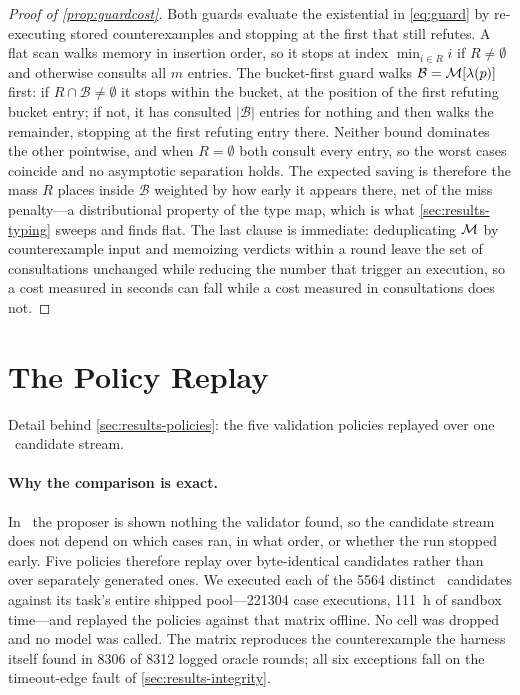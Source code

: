 \begin{proof}[Proof of \cref{prop:guardcost}]
Both guards evaluate the existential in \cref{eq:guard} by re-executing stored
counterexamples and stopping at the first that still refutes. A flat scan walks
memory in insertion order, so it stops at index $\min_{i \in R} i$ if $R \neq
\emptyset$ and otherwise consults all $m$ entries. The bucket-first guard walks
$\mathcal{B} = \mathcal{M}[\lambda(p)]$ first: if $R \cap \mathcal{B} \neq \emptyset$ it
stops within the bucket, at the position of the first refuting bucket entry; if
not, it has consulted $|\mathcal{B}|$ entries for nothing and then walks the
remainder, stopping at the first refuting entry there. Neither bound dominates
the other pointwise, and when $R = \emptyset$ both consult every entry, so the
worst cases coincide and no asymptotic separation holds. The expected saving is
therefore the mass $R$ places inside $\mathcal{B}$ weighted by how early it
appears there, net of the miss penalty---a distributional property of the type
map, which is what \cref{sec:results-typing} sweeps and finds flat. The last clause is
immediate: deduplicating $\mathcal{M}$ by counterexample input and memoizing verdicts
within a round leave the set of consultations unchanged while reducing the
number that trigger an execution, so a cost measured in seconds can fall while
a cost measured in consultations does not.
\end{proof}

\section{The Policy Replay}
\label{app:policies}

Detail behind \cref{sec:results-policies}: the five validation policies
replayed over one \armnomem\ candidate stream.

\paragraph{Why the comparison is exact.}
In \armnomem\ the proposer is shown nothing the validator found, so the
candidate stream does not depend on which cases ran, in what order, or whether
the run stopped early. Five policies therefore replay over byte-identical
candidates rather than over separately generated ones. We executed each of the
\num{5564} distinct \armnomem\ candidates against its task's entire shipped
pool---\num{221304} case executions, \SI{111}{\hour} of sandbox time---and
replayed the policies against that matrix offline. No cell was dropped and no
model was called. The matrix reproduces the counterexample the harness itself
found in \num{8306} of \num{8312} logged oracle rounds; all six exceptions fall
on the timeout-edge fault of \cref{sec:results-integrity}.

